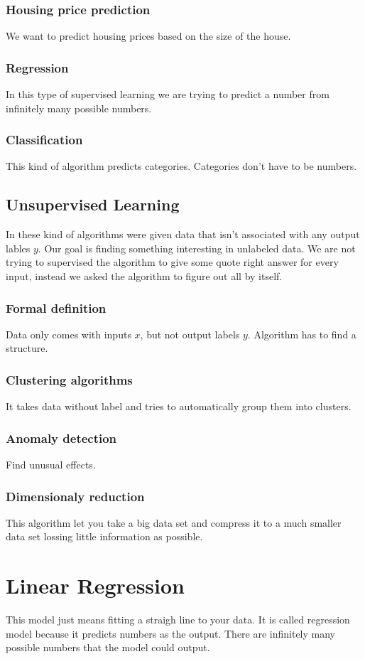 \documentclass[a4paper]{article}
\begin{document}
\subsubsection{Housing price prediction}
\noindent
We want to predict housing prices based on the size of the house.
\subsubsection{Regression}
\noindent
In this type of supervised learning we are trying to predict a number from infinitely 
many possible numbers.
\subsubsection{Classification}
\noindent
This kind of algorithm predicts categories. Categories don't have to be numbers.
\subsection{Unsupervised Learning}
\noindent
In these kind of algorithms were given data that isn't associated with any output
lables \(y\). Our goal is finding something interesting in unlabeled data. We are not trying to
supervised the algorithm to give some quote right answer for every input, instead we asked the 
algorithm to figure out all by itself. 
\subsubsection{Formal definition}
\noindent
Data only comes with inputs \(x\), but not output labels \(y\). Algorithm has to find a structure.
\subsubsection{Clustering algorithms}
\noindent
It takes data without label and tries to automatically group them into clusters.
\subsubsection{Anomaly detection}
\noindent
Find unusual effects.
\subsubsection{Dimensionaly reduction}
\noindent
This algorithm let you take a big data set and compress it to a much smaller data set lossing 
little information as possible.
\section{Linear Regression}
\noindent
This model just means fitting a straigh line to your data. It is called regression model because 
it predicts numbers as the output. There are infinitely many possible numbers that the model could
output.
\end{document}

